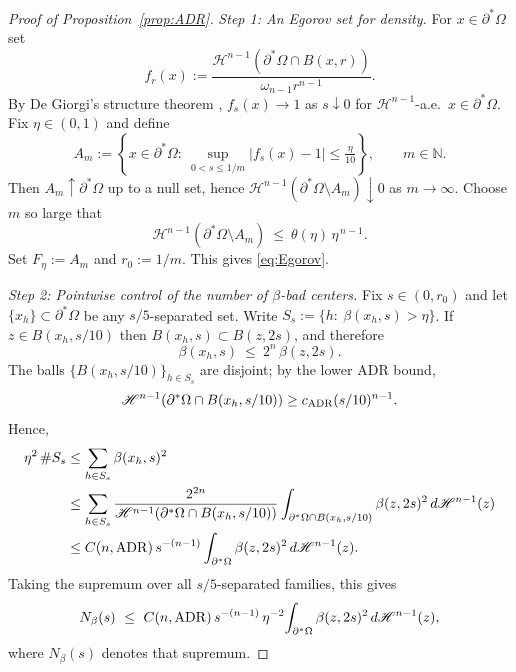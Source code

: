 \documentclass[reqno,11pt]{amsart}
\numberwithin{equation}{section}
\theoremstyle{remark}
\begin{document}
\begin{proof}[Proof of Proposition~\ref{prop:ADR}]
\noindent\emph{Step 1: An Egorov set for density.}
For $x\in\partial^*\Omega$ set
\[
f_r(x):=\frac{\mathscr H^{n-1}(\partial^*\Omega\cap B(x,r))}{\omega_{n-1}r^{n-1}}.
\]
By De Giorgi's structure theorem \cite[Theorem~15.9]{M2012}, $f_s(x)\to 1$ as $s\downarrow 0$ for
$\mathscr H^{n-1}$-a.e.\ $x\in\partial^*\Omega$.
Fix $\eta\in(0,1)$ and define
\[
A_m:=\left\{x\in\partial^*\Omega:\ \sup_{0<s\le 1/m}|f_s(x)-1|\le \tfrac{\eta}{10}\right\},\qquad m\in\mathbb N.
\]
Then $A_m\uparrow \partial^*\Omega$ up to a null set, hence
$\mathscr H^{n-1}(\partial^*\Omega\setminus A_m)\downarrow 0$ as $m\to\infty$.
Choose $m$ so large that
\[
\mathscr H^{n-1}(\partial^*\Omega\setminus A_m)\ \le\ \theta(\eta)\,\eta^{\,n-1}.
\]
Set $F_\eta:=A_m$ and $r_0:=1/m$. This gives \eqref{eq:Egorov}.

\smallskip
\noindent\emph{Step 2: Pointwise control of the number of $\beta$-bad centers.}
Fix $s\in(0,r_0)$ and let $\{x_h\}\subset\partial^*\Omega$ be any $s/5$-separated set.
Write $S_s:=\{h:\ \beta(x_h,s)>\eta\}$.
If $z\in B(x_h,s/10)$ then $B(x_h,s)\subset B(z,2s)$, and therefore
\begin{equation}\label{eq:beta-compare}
  \beta(x_h,s)\ \le\ 2^{n}\,\beta(z,2s).
\end{equation}
The balls $\{B(x_h,s/10)\}_{h\in S_s}$ are disjoint; by the lower ADR bound,
\[
\mathscr H^{n-1}(\partial^*\Omega\cap B(x_h,s/10))\ge c_{\rm ADR}(s/10)^{n-1}.
\]
Hence,
\[
\begin{aligned}
\eta^2\,\#S_s
&\le \sum_{h\in S_s}\beta(x_h,s)^2\\
&\le \sum_{h\in S_s}\frac{2^{2n}}{\mathscr H^{n-1}(\partial^*\Omega\cap B(x_h,s/10))}
   \int_{\partial^*\Omega\cap B(x_h,s/10)}\beta(z,2s)^2\,d\mathscr H^{n-1}(z)\\
&\le C(n,{\rm ADR})\,s^{-(n-1)}\int_{\partial^*\Omega}\beta(z,2s)^2\,d\mathscr H^{n-1}(z).
\end{aligned}
\]
Taking the supremum over all $s/5$-separated families, this gives
\begin{equation}\label{eq:Nbeta-point}
  N_\beta(s)\ \le\ C(n,{\rm ADR})\,s^{-(n-1)}\,\eta^{-2}\!\int_{\partial^*\Omega}\beta(z,2s)^2\,d\mathscr H^{n-1}(z),
\end{equation}
where $N_\beta(s)$ denotes that supremum.


\end{proof}
\end{document}
